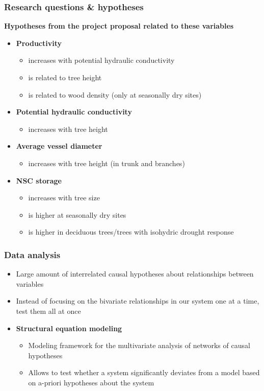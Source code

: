 \documentclass[usepdftitle=false]{beamer}
\newcommand{\Blue}[1]{{\color{blue!50!black}\textbf{#1}}}
\newcommand{\Rar}{$\Rightarrow$}
\newenvironment{changemargin}[2]{%
	\begin{list}{}{%
			\setlength{\topsep}{0pt}%
			\setlength{\leftmargin}{#1}%
			\setlength{\rightmargin}{#2}%
			\setlength{\listparindent}{\parindent}%
			\setlength{\itemindent}{\parindent}%
			\setlength{\parsep}{\parskip}%
		}%
		\item[]}
	{\end{list}
}
\begin{document}
\begin{frame}
	\frametitle{Research questions \& hypotheses}
	\begin{changemargin}{-2em}{-2em}
		\Blue{Hypotheses from the project proposal related to these variables}
		\begin{itemize}
			\item \alert<1>{\textbf{Productivity}}
			\begin{itemize}
				\item increases with potential hydraulic conductivity
				\item is related to tree height
				\item is related to wood density (only at seasonally dry sites)
			\end{itemize}
			\item<2-> \alert<2>{\textbf{Potential hydraulic conductivity}}
			\begin{itemize}
				\item increases with tree height
			\end{itemize}
			\item<3-> \alert<3>{\textbf{Average vessel diameter}}
			\begin{itemize}
				\item increases with tree height (in trunk and branches)
			\end{itemize}
			\item<4-> \alert<4>{\textbf{NSC storage}}
			\begin{itemize}
				\item increases with tree size
				\item is higher at seasonally dry sites
				\item is higher in deciduous trees/trees with isohydric drought response
			\end{itemize}
		\end{itemize}
	\end{changemargin}
\end{frame}

\begin{frame}
	\frametitle{Data analysis}
	\begin{itemize}
		\item<+-| alert@+> Large amount of interrelated causal hypotheses about relationships between variables
		\item<+-| alert@+>[\Rar] Instead of focusing on the bivariate relationships in our system one at a time, test them all at once
		\item<visible@+-| alert@+>[\Rar]\textbf{Structural equation modeling}
		\begin{itemize}
			\item Modeling framework for the multivariate analysis of networks of causal hypotheses
			\item Allows to test whether a system significantly deviates from a model based on a-priori hypotheses about the system
		\end{itemize}		
	\end{itemize}
\end{frame}
\end{document}

